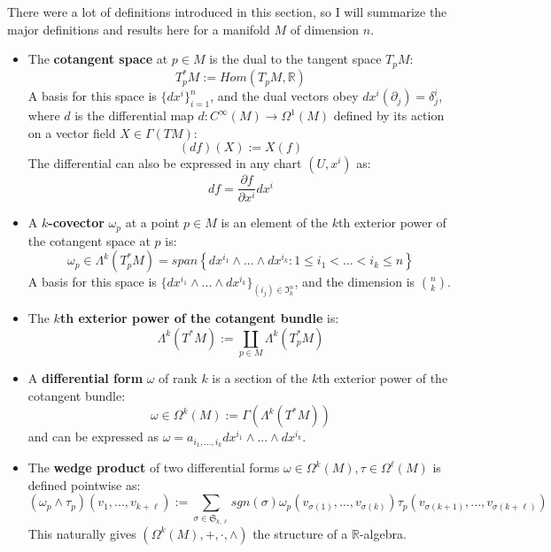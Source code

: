 \documentclass[11pt, oneside]{article}   	%
\theoremstyle{definition}
\begin{document}
There were a lot of definitions introduced in this section, so I will summarize the major definitions and results here for a 
manifold $M$ of dimension $n$.
\begin{itemize}
	\item The \textbf{cotangent space} at $p\in M$ is the dual to the tangent space $T_p M$:
	\begin{equation}
		T_p^* M := Hom(T_p M, \mathbb R)
	\end{equation}
	A basis for this space is $\{dx^i\}_{i = 1}^n$, and the dual vectors obey $dx^i(\partial_j) = \delta^i_j$, where $d$ is the 
	differential map $d : C^\infty(M)\rightarrow\Omega^1(M)$ defined by its action on a vector field $X\in\Gamma(TM)$:
	\begin{equation}
		(df)(X) := X(f)
	\end{equation}
	The differential can also be expressed in any chart $(U, x^i)$ as:
	\begin{equation}
		df = \frac{\partial f}{\partial x^i} dx^i
	\end{equation}
	
	\item A \textbf{$k$-covector} $\omega_p$ at a point $p\in M$ is an element of the $k$th exterior power of the cotangent 
	space at $p$ is: 
	\begin{equation}
		\omega_p\in\Lambda^k\left(T_p^* M\right) = span\left\{dx^{i_1}\wedge ...\wedge dx^{i_k} : 1\leq i_1 < ... < i_k\leq n 
		\right\}
	\end{equation}
	A basis for this space is $\{dx^{i_1}\wedge ...\wedge dx^{i_k}\}_{(i_j)\in\mathfrak I_k^n}$, and the dimension is $n\choose 
	k$. 
	
	\item The \textbf{$k$th exterior power of the cotangent bundle} is:
	\begin{equation}
		\Lambda^k\left(T^* M\right) :=\coprod_{p\in M}\Lambda^k\left(T_p^* M\right)
	\end{equation}
	
	\item A \textbf{differential form} $\omega$ of rank $k$ is a section of the $k$th exterior power of the cotangent bundle:
	\begin{equation}
		\omega\in\Omega^k(M) := \Gamma(\Lambda^k(T^* M))
	\end{equation}
	and can be expressed as $\omega = a_{i_1, ..., i_k} dx^{i_1}\wedge ...\wedge dx^{i_k}$. 
	
	\item The \textbf{wedge product} of two differential forms $\omega\in\Omega^k(M), \tau\in\Omega^\ell(M)$ is defined 
	pointwise as:
	\begin{equation}
		(\omega_p\wedge\tau_p)(v_1, ..., v_{k + \ell}) := \sum_{\sigma\in\mathfrak S_{k, \ell}} sgn(\sigma)
		\omega_p(v_{\sigma(1)}, ..., v_{\sigma(k)})\tau_p(v_{\sigma(k + 1)}, ..., v_{\sigma(k + \ell)})
	\end{equation}
	This naturally gives $(\Omega^k(M), +, \cdot, \wedge)$ the structure of a $\mathbb R$-algebra. 
	

\end{itemize}
\end{document}

